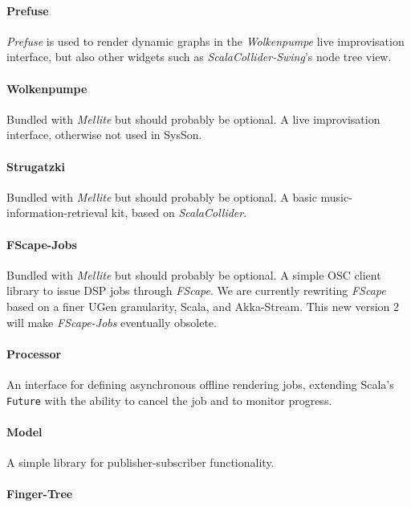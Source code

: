 \documentclass[11pt,a4paper]{article}
\newcommand{\software}[1]{\textit{#1}}
\newcommand{\sysson}[0]{SysSon}
\begin{document}
\paragraph{Prefuse}

\software{Prefuse} is used to render dynamic graphs in the \software{Wolkenpumpe} live improvisation interface, but also other widgets such as \software{ScalaCollider-Swing}'s node tree view.

\paragraph{Wolkenpumpe}

Bundled with \software{Mellite} but should probably be optional. A live improvisation interface, otherwise not used in \sysson{}.

\paragraph{Strugatzki}

Bundled with \software{Mellite} but should probably be optional. A basic music-information-retrieval kit, based on \software{ScalaCollider}.

\paragraph{FScape-Jobs}

Bundled with \software{Mellite} but should probably be optional. A simple OSC client library to issue DSP jobs through \software{FScape}. We are currently rewriting \software{FScape} based on a finer UGen granularity, Scala, and Akka-Stream. This new version 2 will make \software{FScape-Jobs} eventually obsolete.

\paragraph{Processor}

An interface for defining asynchronous offline rendering jobs, extending Scala's \verb!Future! with the ability to cancel the job and to monitor progress.

\paragraph{Model}

A simple library for publisher-subscriber functionality.

\paragraph{Finger-Tree}
\end{document}
